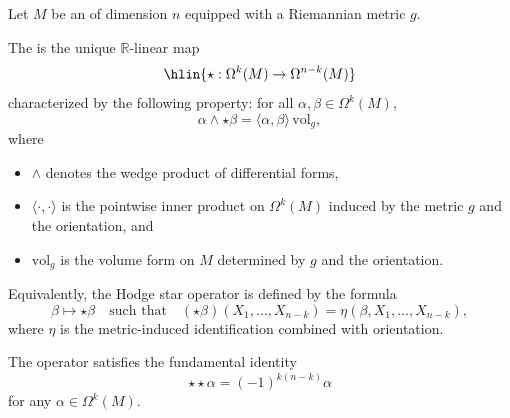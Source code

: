 
\begin{definition} \label{definition:hodge_star_operator_of_a_smooth_oriented_riemannian_manifold}
    Let $M$ be an    of dimension $n$ equipped with a Riemannian metric $g$. 

    The  is the unique $\mathbb{R}$-linear map
    $$\hlin{\star : \Omega^k(M) \to \Omega^{n-k}(M)}$$
    characterized by the following property: for all $\alpha, \beta \in \Omega^k(M)$,
    $$ \alpha \wedge \star \beta = \langle \alpha, \beta \rangle \, \mathrm{vol}_g, $$
    where
    \begin{itemize}
        \item $\wedge$ denotes the wedge product of differential forms,
        \item $\langle \cdot, \cdot \rangle$ is the pointwise inner product on $\Omega^k(M)$ induced by the metric $g$ and the orientation, and
        \item $\mathrm{vol}_g$ is the volume form on $M$ determined by $g$ and the orientation. 
    \end{itemize}

    Equivalently, the Hodge star operator is defined by the formula
    $$
    \beta \mapsto \star \beta \quad \text{such that} \quad (\star \beta)(X_1, \ldots, X_{n-k}) = \eta(\beta, X_1, \ldots, X_{n-k}),
    $$
    where $\eta$ is the metric-induced identification combined with orientation. 

    The operator satisfies the fundamental identity
    $$ \star \star \alpha = (-1)^{k(n-k)} \alpha $$
    for any $\alpha \in \Omega^k(M)$.

\end{definition}